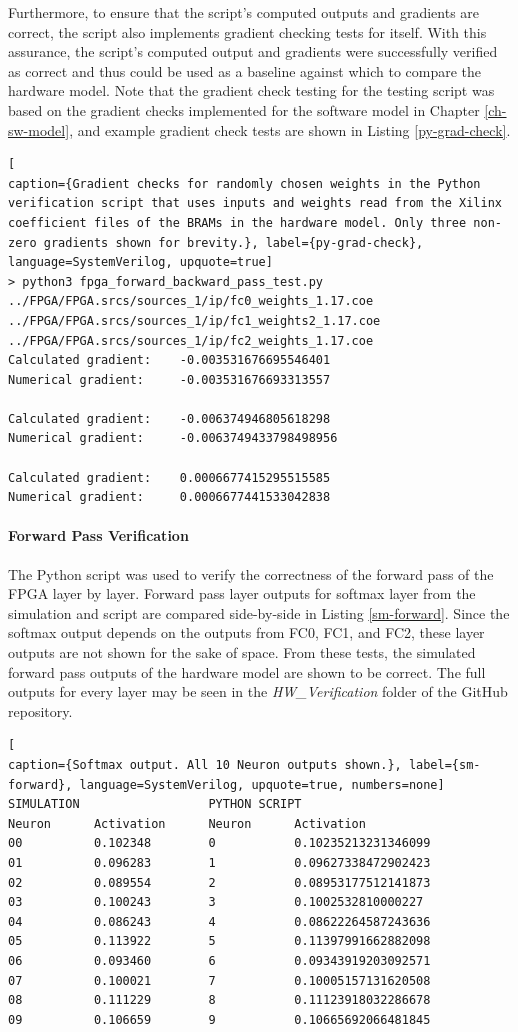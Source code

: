 Furthermore, to ensure that the script's computed outputs and gradients are correct, the script also implements gradient checking tests for itself. With this assurance,  the script's computed output and gradients were successfully verified as correct and thus could be used as a baseline against which to compare the hardware model. Note that the gradient check testing for the testing script was based on the gradient checks implemented for the software model in Chapter \ref{ch-sw-model}, and example gradient check tests are shown in Listing \ref{py-grad-check}.

\begin{lstlisting}[
caption={Gradient checks for randomly chosen weights in the Python verification script that uses inputs and weights read from the Xilinx coefficient files of the BRAMs in the hardware model. Only three non-zero gradients shown for brevity.}, label={py-grad-check}, language=SystemVerilog, upquote=true]
> python3 fpga_forward_backward_pass_test.py
../FPGA/FPGA.srcs/sources_1/ip/fc0_weights_1.17.coe
../FPGA/FPGA.srcs/sources_1/ip/fc1_weights2_1.17.coe
../FPGA/FPGA.srcs/sources_1/ip/fc2_weights_1.17.coe
Calculated gradient:    -0.003531676695546401
Numerical gradient:     -0.003531676693313557

Calculated gradient:    -0.006374946805618298
Numerical gradient:     -0.0063749433798498956

Calculated gradient:    0.0006677415295515585
Numerical gradient:     0.0006677441533042838
\end{lstlisting}

\paragraph{Forward Pass Verification}
The Python script was used to verify the correctness of the forward pass of the FPGA layer by layer. Forward pass layer outputs for softmax layer from the simulation and script are compared side-by-side in Listing \ref{sm-forward}. Since the softmax output depends on the outputs from FC0, FC1, and FC2, these layer outputs are not shown for the sake of space. From these tests, the simulated forward pass outputs of the hardware model are shown to be correct. The full outputs for every layer may be seen in the \textit{HW\_Verification} folder of the GitHub repository.

\begin{lstlisting}[
caption={Softmax output. All 10 Neuron outputs shown.}, label={sm-forward}, language=SystemVerilog, upquote=true, numbers=none]
SIMULATION                  PYTHON SCRIPT
Neuron		Activation      Neuron		Activation
00			0.102348        0			0.10235213231346099
01			0.096283        1			0.09627338472902423
02			0.089554        2			0.08953177512141873
03			0.100243        3			0.1002532810000227
04			0.086243        4			0.08622264587243636
05			0.113922        5			0.11397991662882098
06			0.093460        6			0.09343919203092571
07			0.100021        7			0.10005157131620508
08			0.111229        8			0.11123918032286678
09			0.106659        9			0.10665692066481845
\end{lstlisting}

